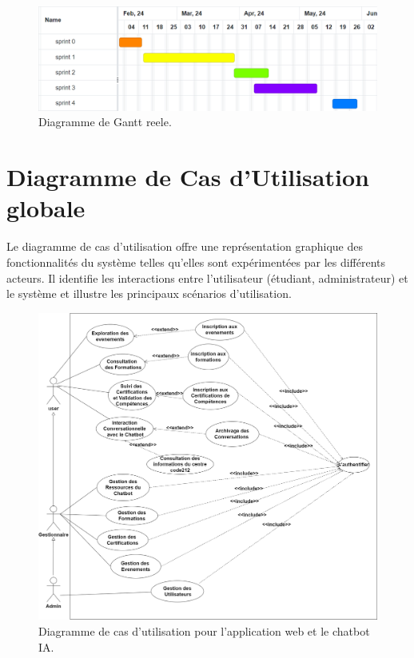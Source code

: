 \documentclass[a4paper, 11pt, openany]{report}
\begin{document}
\begin{figure}[h!]
\centering
\includegraphics[width=\textwidth]{gantt-reel.png}
\caption{Diagramme de Gantt reele.}
\label{fig:reel-gantt}
\end{figure}
\clearpage
\section{Diagramme de Cas d'Utilisation globale}
Le diagramme de cas d'utilisation offre une représentation graphique des fonctionnalités du système telles qu'elles sont expérimentées par les différents acteurs. Il identifie les interactions entre l'utilisateur (étudiant, administrateur) et le système et illustre les principaux scénarios d'utilisation. 
\clearpage

\begin{figure}[h!]

\centering
\includegraphics[width=\textwidth]{images/usecase.png}
\caption{Diagramme de cas d'utilisation pour l'application web et le chatbot IA.}
\label{fig:use_case_diagram}
\end{figure}
\end{document}

